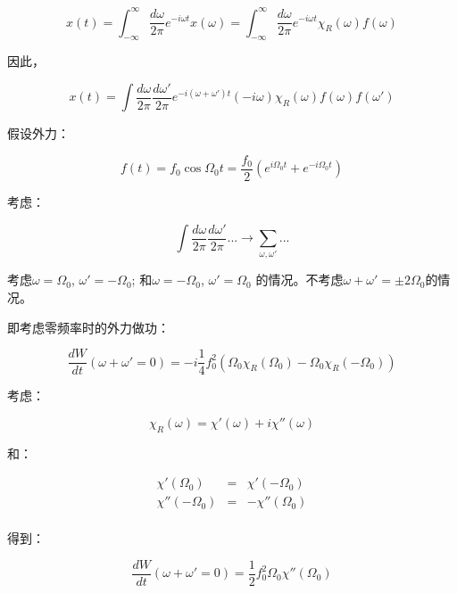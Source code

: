 \begin{equation*}
x(t) = \int_{-\infty}^{\infty} \frac{d \omega}{2 \pi} e^{-i \omega t } x (\omega) = \int_{-\infty}^{\infty} \frac{d \omega}{2 \pi} e^{-i \omega t } \chi_R (\omega) f(\omega)
\end{equation*}

因此，

\begin{equation}
x(t) = \int \frac{d \omega}{ 2\pi}\frac{d \omega'}{2 \pi} e^{-i (\omega + \omega') t } (-i\omega) \chi_R (\omega) f(\omega) f(\omega')
\end{equation}

假设外力：

\begin{equation}
f(t) = f_0 \cos \Omega_0 t = \frac{f_0}{2} ( e^{i \Omega_0 t}  +  e^{ - i \Omega_0 t} )
\end{equation}

考虑：

\begin{equation*}
\int \frac{d \omega}{2 \pi} \frac{d \omega' }{2 \pi} ...  \to \sum\limits_{\omega, \omega'} ...
\end{equation*}

考虑$\omega = \Omega_0$, $\omega' = - \Omega_0$; 和$\omega = - \Omega_0$, $\omega' =  \Omega_0$ 的情况。不考虑$\omega + \omega' = \pm 2\Omega_0$的情况。

即考虑零频率时的外力做功：

\begin{equation}
\frac{dW}{dt} (\omega + \omega' = 0) = - i \frac{1}{4}f_0^2 (\Omega_0 \chi_R(\Omega_0) - \Omega_0 \chi_R( - \Omega_0))
\end{equation}

考虑：

\begin{equation*}
\chi_R(\omega) = \chi' (\omega) + i \chi'' (\omega)
\end{equation*}

和：

\begin{eqnarray*}
\chi'(\Omega_0)  & = & \chi'(-\Omega_0)  \\
\chi'' (-\Omega_0)  & = & - \chi'' (\Omega_0) \\
\end{eqnarray*}

得到：

\begin{equation}
\frac{dW}{dt} (\omega + \omega' = 0) = \frac{1}{2}f_0^2 \Omega_0 \chi''(\Omega_0)
\end{equation}

